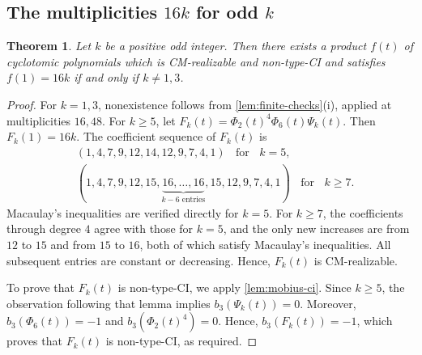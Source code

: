 \documentclass[11pt,a4paper]{amsart}
\newtheorem{theorem}{Theorem}[section]
\theoremstyle{definition}
\theoremstyle{remark}
\begin{document}
\subsection{The multiplicities \texorpdfstring{$16k$}{16k} for odd \texorpdfstring{$k$}{k}}\label{sec:16k}
\begin{theorem}\label{thm:16k-odd}
Let $k$ be a positive odd integer. Then there exists a product $f(t)$ of cyclotomic polynomials which is CM-realizable and non-type-CI and satisfies $f(1)=16k$ if and only if $k\ne1,3$.
\end{theorem}
\begin{proof}
For $k=1,3$, nonexistence follows from \cref{lem:finite-checks}\textup{(i)}, applied at multiplicities $16,48$. For $k\ge5$, let $F_k(t)=\Phi_2(t)^4\Phi_6(t)\Psi_k(t)$. Then $F_k(1)=16k$. The coefficient sequence of $F_k(t)$ is
\begin{align*}
&(1,4,7,9,12,14,12,9,7,4,1) \;\;\text{ for }\;\; k=5, \\
&(1,4,7,9,12,15,\underbrace{16,\ldots,16}_{k-6\text{ entries}},15,12,9,7,4,1) \;\;\text{ for }\;\;k \geq 7.
\end{align*}
Macaulay's inequalities are verified directly for $k=5$. For $k\ge7$, the coefficients through degree $4$ agree with those for $k=5$, and the only new increases are from $12$ to $15$ and from $15$ to $16$, both of which satisfy Macaulay's inequalities. All subsequent entries are constant or decreasing. Hence, $F_k(t)$ is CM-realizable.

To prove that $F_k(t)$ is non-type-CI, we apply \cref{lem:mobius-ci}. Since $k\ge5$, the observation following that lemma implies $b_3(\Psi_k(t))=0$. Moreover, $b_3(\Phi_6(t))=-1$ and $b_3(\Phi_2(t)^4)=0$. Hence, $b_3(F_k(t))=-1$, which proves that $F_k(t)$ is non-type-CI, as required.
\end{proof}
\end{document}
